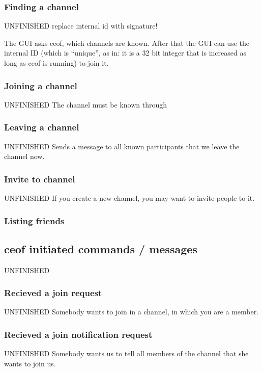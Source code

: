 \documentclass[12pt,a4paper]{book}
\begin{document}
\subsubsection{Finding a channel}
UNFINISHED
replace internal id with signature!

The GUI asks ceof, which channels are known. After that the GUI
can use the internal ID (which is "`unique"', as in: it is a 32 bit integer
that is increased as long as ceof is running) to join it.
\subsubsection{Joining a channel}
UNFINISHED
The channel must be known through 
\subsubsection{Leaving a channel}
UNFINISHED
Sends a message to all known participants that we leave the channel now.
\subsubsection{Invite to channel}
UNFINISHED
If you create a new channel, you may want to invite people to it.
\subsubsection{Listing friends}
\subsection{ceof initiated commands / messages}
UNFINISHED
\subsubsection{Recieved a join request}
UNFINISHED
Somebody wants to join in a channel, in which you are a member.
\subsubsection{Recieved a join notification request}
UNFINISHED
Somebody wants us to tell all members of the channel that she wants to join us.
\end{document}
